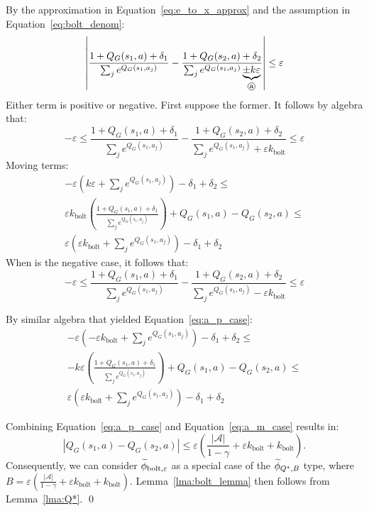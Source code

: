 By the approximation in Equation~\ref{eq:e_to_x_approx} and the assumption in Equation~\ref{eq:bolt_denom}:
\begin{align}
\left|\frac{1 + Q_G(s_1,a) + \delta_1}{\sum_j e^{Q_G(s_1,a_j)}} - \frac{1 + Q_G(s_2,a) + \delta_2}{\sum_j e^{Q_G(s_1,a_j)} \underbrace{\pm k\varepsilon}_{\circled{a}}}\right| \leq \varepsilon \label{eq:bolt_with_approx}
\end{align}
Either term  is positive or negative. First suppose the former. It follows by algebra that:
\begin{equation}
-\varepsilon \leq \frac{1 + Q_G(s_1,a) + \delta_1}{\sum_j e^{Q_G(s_1,a_j)}} - \frac{1 + Q_G(s_2,a) + \delta_2}{\sum_j e^{Q_G(s_1,a_j)} + \varepsilon k_{\text{bolt}} } \leq \varepsilon
\end{equation}
Moving terms:
\begin{multline}
-\varepsilon \left(k\varepsilon + \sum_j e^{Q_G(s_1,a_j)}\right) - \delta_1 + \delta_2 \leq \\
\varepsilon k_{\text{bolt}} \left(\frac{1+Q_G(s_1,a) + \delta_1}{\sum_j e^{Q_G(s_1,a_j)}}\right) + Q_G(s_1,a) - Q_G(s_2,a) \leq \\
\varepsilon \left(\varepsilon k_{\text{bolt}}  + \sum_j e^{Q_G(s_1,a_j)}\right) - \delta_1 + \delta_2
\label{eq:a_p_case}
\end{multline}
When  is the negative case, it follows that:
\begin{equation}
-\varepsilon \leq \frac{1 + Q_G(s_1,a) + \delta_1}{\sum_j e^{Q_G(s_1,a_j)}} - \frac{1 + Q_G(s_2,a) + \delta_2}{\sum_j e^{Q_G(s_1,a_j)} - \varepsilon k_{\text{bolt}} } \leq \varepsilon
\end{equation}

By similar algebra that yielded Equation~\ref{eq:a_p_case}:
\begin{multline}
-\varepsilon \left(-\varepsilon k_{\text{bolt}}  + \sum_j e^{Q_G(s_1,a_j)}\right) - \delta_1 + \delta_2 \leq \\
-k\varepsilon\left(\frac{1+Q_G(s_1,a) + \delta_1}{\sum_j e^{Q_G(s_1,a_j)}}\right) + Q_G(s_1,a) - Q_G(s_2,a) \leq \\
\varepsilon \left(\varepsilon k_{\text{bolt}}  + \sum_j e^{Q_G(s_1,a_j)}\right) - \delta_1 + \delta_2
\label{eq:a_m_case}
\end{multline}

Combining Equation~\ref{eq:a_p_case} and Equation~\ref{eq:a_m_case} results in:
\begin{equation}
\left|Q_G(s_1,a) - Q_G(s_2,a)\right| \leq \varepsilon \left(\frac{|\mathcal{A}|}{1-\gamma} + \varepsilon k_{\text{bolt}}  + k_{\text{bolt}}  \right).
\label{eq:bolt_qs}
\end{equation}
Consequently, we can consider $\widetilde \phi_{\text{bolt},\varepsilon}$ as a special case of the $\widetilde \phi_{Q^*,B}$ type, where $B = \varepsilon \left(\frac{|\mathcal{A}|}{1-\gamma} + \varepsilon k_{\text{bolt}}  + k_{\text{bolt}}  \right)$. Lemma~\ref{lma:bolt_lemma} then follows from Lemma~\ref{lma:Q*}.
\qed

